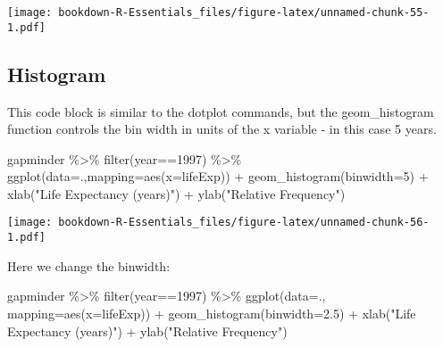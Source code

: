 \documentclass[
]{book}
\newenvironment{Shaded}{\begin{snugshade}}{\end{snugshade}}
\newcommand{\AttributeTok}[1]{\textcolor[rgb]{0.77,0.63,0.00}{#1}}
\newcommand{\DecValTok}[1]{\textcolor[rgb]{0.00,0.00,0.81}{#1}}
\newcommand{\FloatTok}[1]{\textcolor[rgb]{0.00,0.00,0.81}{#1}}
\newcommand{\FunctionTok}[1]{\textcolor[rgb]{0.00,0.00,0.00}{#1}}
\newcommand{\NormalTok}[1]{#1}
\newcommand{\SpecialCharTok}[1]{\textcolor[rgb]{0.00,0.00,0.00}{#1}}
\newcommand{\StringTok}[1]{\textcolor[rgb]{0.31,0.60,0.02}{#1}}
\begin{document}
\texttt{[image: bookdown-R-Essentials\_files/figure-latex/unnamed-chunk-55-1.pdf]}

\hypertarget{histogram}{%
\subsection{Histogram}\label{histogram}}

This code block is similar to the dotplot commands, but the geom\_histogram function controls the bin width in units of the x variable - in this case 5 years.

\begin{Shaded}
\begin{Highlighting}[]
\NormalTok{gapminder }\SpecialCharTok{\%\textgreater{}\%} 
  \FunctionTok{filter}\NormalTok{(year}\SpecialCharTok{==}\DecValTok{1997}\NormalTok{) }\SpecialCharTok{\%\textgreater{}\%}
\FunctionTok{ggplot}\NormalTok{(}\AttributeTok{data=}\NormalTok{.,}\AttributeTok{mapping=}\FunctionTok{aes}\NormalTok{(}\AttributeTok{x=}\NormalTok{lifeExp)) }\SpecialCharTok{+} 
  \FunctionTok{geom\_histogram}\NormalTok{(}\AttributeTok{binwidth=}\DecValTok{5}\NormalTok{) }\SpecialCharTok{+} 
  \FunctionTok{xlab}\NormalTok{(}\StringTok{"Life Expectancy (years)"}\NormalTok{) }\SpecialCharTok{+}
  \FunctionTok{ylab}\NormalTok{(}\StringTok{"Relative Frequency"}\NormalTok{)}
\end{Highlighting}
\end{Shaded}

\texttt{[image: bookdown-R-Essentials\_files/figure-latex/unnamed-chunk-56-1.pdf]}

Here we change the binwidth:

\begin{Shaded}
\begin{Highlighting}[]
\NormalTok{gapminder }\SpecialCharTok{\%\textgreater{}\%} 
  \FunctionTok{filter}\NormalTok{(year}\SpecialCharTok{==}\DecValTok{1997}\NormalTok{) }\SpecialCharTok{\%\textgreater{}\%}
\FunctionTok{ggplot}\NormalTok{(}\AttributeTok{data=}\NormalTok{., }\AttributeTok{mapping=}\FunctionTok{aes}\NormalTok{(}\AttributeTok{x=}\NormalTok{lifeExp)) }\SpecialCharTok{+} 
  \FunctionTok{geom\_histogram}\NormalTok{(}\AttributeTok{binwidth=}\FloatTok{2.5}\NormalTok{) }\SpecialCharTok{+} 
  \FunctionTok{xlab}\NormalTok{(}\StringTok{"Life Expectancy (years)"}\NormalTok{) }\SpecialCharTok{+}
  \FunctionTok{ylab}\NormalTok{(}\StringTok{"Relative Frequency"}\NormalTok{)}
\end{Highlighting}
\end{Shaded}
\end{document}
